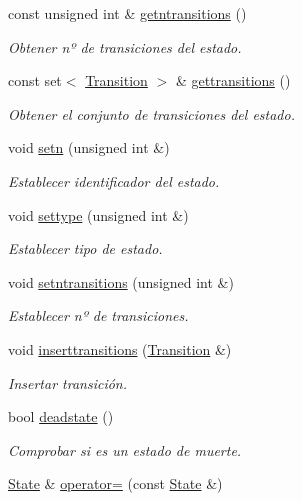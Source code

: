 \begin{DoxyCompactItemize}
const unsigned int \& \hyperlink{class_state_ac6d5a2e94f19b88ef932f84380420b35}{getntransitions} ()
\begin{DoxyCompactList}\small\item\em Obtener nº de transiciones del estado. \end{DoxyCompactList}\item 
const set$<$ \hyperlink{class_transition}{Transition} $>$ \& \hyperlink{class_state_aaafb1d7a01590d4b2ff055ca31028d65}{gettransitions} ()
\begin{DoxyCompactList}\small\item\em Obtener el conjunto de transiciones del estado. \end{DoxyCompactList}\item 
void \hyperlink{class_state_af336de67e76fd18020cd363f82a2172e}{setn} (unsigned int \&)
\begin{DoxyCompactList}\small\item\em Establecer identificador del estado. \end{DoxyCompactList}\item 
void \hyperlink{class_state_af24ca7913f14e5e73bcead784b4f322d}{settype} (unsigned int \&)
\begin{DoxyCompactList}\small\item\em Establecer tipo de estado. \end{DoxyCompactList}\item 
void \hyperlink{class_state_aae392034fc0fdf25307007548f5076d6}{setntransitions} (unsigned int \&)
\begin{DoxyCompactList}\small\item\em Establecer nº de transiciones. \end{DoxyCompactList}\item 
void \hyperlink{class_state_af93c774d8cbb27b81f2c86a0036f32d2}{inserttransitions} (\hyperlink{class_transition}{Transition} \&)
\begin{DoxyCompactList}\small\item\em Insertar transición. \end{DoxyCompactList}\item 
bool \hyperlink{class_state_ab13a676e36927c127c62dba45ad7b635}{deadstate} ()
\begin{DoxyCompactList}\small\item\em Comprobar si es un estado de muerte. \end{DoxyCompactList}\item 
\hyperlink{class_state}{State} \& \hyperlink{class_state_a520af8c9479e6832b07612907b2c8108}{operator=} (const \hyperlink{class_state}{State} \&)

\end{DoxyCompactItemize}
